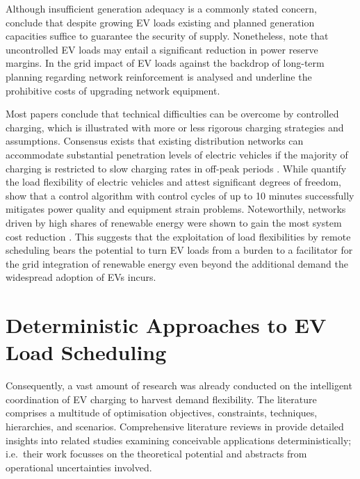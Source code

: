 Although insufficient generation adequacy is a commonly stated concern, \cite{Webster1999, Hadley2009, Kintner-Meyer2007} conclude that despite growing EV loads existing and planned generation capacities suffice to guarantee the security of supply. Nonetheless, \cite{Dubey2015} note that uncontrolled EV loads may entail a significant reduction in power reserve margins. In \cite{Marwitz2016, Rassaei2014} the grid impact of EV loads against the backdrop of long-term planning regarding network reinforcement is analysed and underline the prohibitive costs of upgrading network equipment.

Most papers conclude that technical difficulties can be overcome by controlled charging, which is illustrated with more or less rigorous charging strategies and assumptions. Consensus exists that existing distribution networks can accommodate substantial penetration levels of electric vehicles if the majority of charging is restricted to slow charging rates in off-peak periods \cite{Richardson2012a}. While \cite{Schuller2015a} quantify the load flexibility of electric vehicles and attest significant degrees of freedom, \cite{Quiros-Tortos2016} show that a control algorithm with control cycles of up to 10 minutes successfully mitigates power quality and equipment strain problems. Noteworthily, networks driven by high shares of renewable energy were shown to gain the most system cost reduction \cite{Shortt2012}. This suggests that the exploitation of load flexibilities by remote scheduling bears the potential to turn EV loads from a burden to a facilitator for the grid integration of renewable energy even beyond the additional demand the widespread adoption of EVs incurs.

\section{Deterministic Approaches to EV Load Scheduling}
\label{sec:deterlr}

Consequently, a vast amount of research was already conducted on the intelligent coordination of EV charging to harvest demand flexibility. The literature comprises a multitude of optimisation objectives, constraints, techniques, hierarchies, and scenarios. Comprehensive literature reviews in \cite{Mukherjee2015, Rajakaruna2015, Tan2016a} provide detailed insights into related studies examining conceivable applications deterministically; i.e.\ their work focusses on the theoretical potential and abstracts from operational uncertainties involved.

